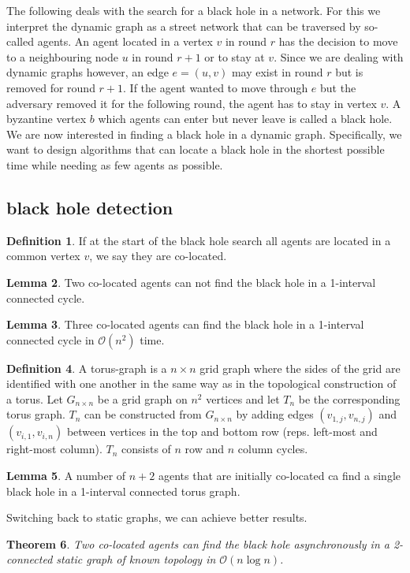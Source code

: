 \documentclass[a4paper, 12pt]{article}
\theoremstyle{plain}
\newtheorem{theorem}{Theorem}[section] %
\theoremstyle{definition}
\newtheorem{definition}[theorem]{Definition} %
\theoremstyle{lemma}
\newtheorem{lemma}[theorem]{Lemma}
\theoremstyle{remark}
\theoremstyle{corollary}
\theoremstyle{example}
\begin{document}
	The following deals with the search for a black hole in a network. For this we interpret the dynamic graph as a street network that can be traversed by so-called agents. An agent located in a vertex $v$ in round $r$ has the decision to move to a neighbouring node $u$ in round $r+1$ or to stay at $v$. Since we are dealing with dynamic graphs however, an edge $e=(u,v)$ may exist in round $r$ but is removed for round $r+1$. If the agent wanted to move through $e$ but the adversary removed it for the following round, the agent has to stay in vertex $v$. A byzantine vertex $b$ which agents can enter but never leave is called a black hole. We are now interested in finding a black hole in a dynamic graph. Specifically, we want to design algorithms that can locate a black hole in the shortest possible time while needing as few agents as possible.
	\subsection{black hole detection}
	\begin{definition}
		If at the start of the black hole search all agents are located in a common vertex $v$, we say they are co-located.
	\end{definition}
	\begin{lemma}
		Two co-located agents can not find the black hole in a 1-interval connected cycle.
	\end{lemma}
	\begin{lemma}
		Three co-located agents can find the black hole in a 1-interval connected cycle in $\mathcal{O}(n^2)$ time.
	\end{lemma}
	\begin{definition}
		A torus-graph is a $n\times n$ grid graph where the sides of the grid are identified with one another in the same way as in the topological construction of a torus. Let $G_{n\times n}$ be a grid graph on $n^2$ vertices and let $T_n$ be the corresponding torus graph. $T_n$ can be constructed from $G_{n \times n}$ by adding edges $(v_{1,j}, v_{n,j})$ and $(v_{i,1}, v_{i,n})$ between vertices in the top and bottom row (reps. left-most and right-most column). $T_n$ consists of $n$ row and $n$ column cycles.
	\end{definition}
	\begin{lemma}
		A number of $n+2$ agents that are initially co-located ca find a single black hole in a 1-interval connected torus graph.
	\end{lemma}
	Switching back to static graphs, we can achieve better results.
	\begin{theorem}
		Two co-located agents can find the black hole asynchronously in a 2-connected static graph of known topology in $\mathcal{O}(n\log n)$. 
	\end{theorem}
\end{document}
